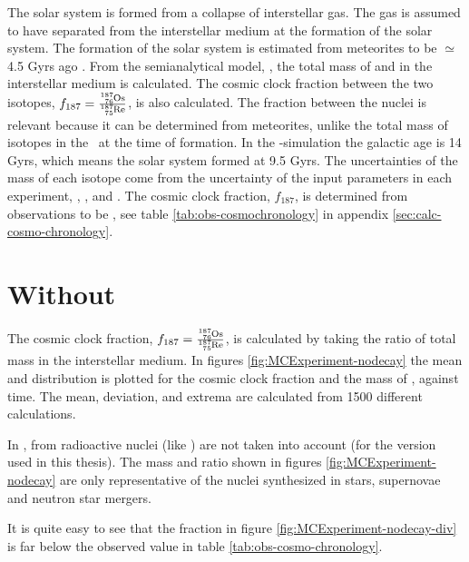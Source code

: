 The solar system is formed from a collapse of interstellar gas.
The gas is assumed to have separated from the interstellar medium at the formation of the solar system.
The formation of the solar system is estimated from meteorites to be $\simeq$ 4.5 Gyrs ago .
From the semianalytical model, \omegamodel, the total mass of  and  in the interstellar medium is calculated.
The cosmic clock fraction between the two isotopes, $f_{187} = \frac{\os{187}}{\re{187}}$, is also calculated.
The fraction between the nuclei is relevant because it can be determined from meteorites, unlike the total mass of isotopes in the \sos\ at the time of formation.
In the \eris-simulation the galactic age is 14 Gyrs, which means the solar system formed at 9.5 Gyrs.
The uncertainties of the mass of each isotope come from the uncertainty of the input parameters in each experiment, \expone, \exptwo, and \expthree.
The cosmic clock fraction, $f_{187}$, is determined from observations to be , see table \ref{tab:obs-cosmochronology} in appendix \ref{sec:calc-cosmo-chronology}.


\section{Without \betadecay}
\label{sec:results-nodecay}
\setlength{\subfigwidth}{0.40\textwidth}
\setlength{\figwidth}{0.6\textwidth}
The cosmic clock fraction, $f_{187} = \frac{\os{187}}{\re{187}}$, is calculated by taking the ratio of total mass in the interstellar medium.
In figures \ref{fig:MCExperiment-nodecay} the mean and distribution is plotted for the cosmic clock fraction and the mass of ,  against time.
The mean, deviation, and extrema are calculated from 1500 different calculations.

In \omegamodel, \betadecay from radioactive nuclei (like ) are not taken into account (for the version used in this thesis).
The mass and ratio shown in figures \ref{fig:MCExperiment-nodecay} are only representative of the nuclei synthesized in stars, supernovae and neutron star mergers.

It is quite easy to see that the fraction in figure \ref{fig:MCExperiment-nodecay-div} is far below the observed value in table \ref{tab:obs-cosmo-chronology}.

